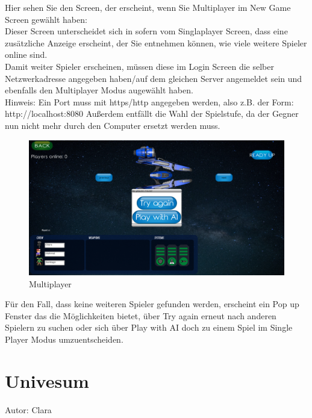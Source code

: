\documentclass[fontsize=12pt,paper=a4,twoside]{scrartcl}
\begin{document}
Hier sehen Sie den Screen, der erscheint, wenn Sie  Multiplayer im New Game Screen gewählt haben:\\
Dieser Screen unterscheidet sich in sofern vom Singlaplayer Screen, dass eine zusätzliche Anzeige erscheint, der Sie entnehmen können, wie viele weitere Spieler online sind.\\
Damit weiter Spieler erscheinen, müssen diese im Login Screen die selber Netzwerkadresse angegeben haben/auf dem gleichen Server angemeldet sein und ebenfalls den Multiplayer Modus augewählt haben.\\
Hinweis: Ein Port muss mit https/http angegeben werden, also z.B. der Form: http://localhost:8080
Außerdem entfällt die Wahl der Spielstufe, da der Gegner nun nicht mehr durch den Computer ersetzt werden muss.

\begin{figure}[htp]
	\centering
	\includegraphics[width=1.00\linewidth]{pics/MultiPlayer01.png}
	\caption{Multiplayer}
	\label{fig1}
\end{figure}

Für den Fall, dass keine weiteren Spieler gefunden werden, erscheint ein Pop up Fenster das die Möglichkeiten bietet, über Try again erneut nach anderen Spielern zu suchen
oder sich über Play with AI doch zu einem Spiel im Single Player Modus umzuentscheiden.\\
 
\newpage
\section{Univesum}
Autor: Clara\\
\end{document}
